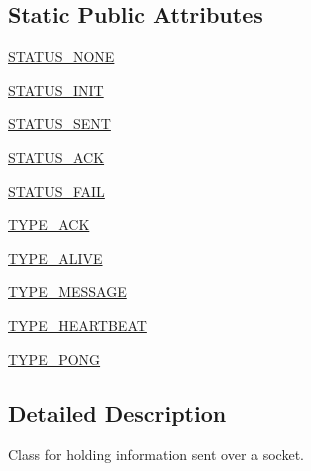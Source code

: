 \subsection*{Static Public Attributes}
\begin{DoxyCompactItemize}
\item 
\hyperlink{classparlai_1_1mturk_1_1core_1_1socket__manager_1_1Packet_a1237bf3d9cb9fef156dace9dd2de8f06}{S\+T\+A\+T\+U\+S\+\_\+\+N\+O\+NE}
\item 
\hyperlink{classparlai_1_1mturk_1_1core_1_1socket__manager_1_1Packet_ac7a439a9aef3339f42558e27171f7061}{S\+T\+A\+T\+U\+S\+\_\+\+I\+N\+IT}
\item 
\hyperlink{classparlai_1_1mturk_1_1core_1_1socket__manager_1_1Packet_abfabd845764bfa00699af28d4deea584}{S\+T\+A\+T\+U\+S\+\_\+\+S\+E\+NT}
\item 
\hyperlink{classparlai_1_1mturk_1_1core_1_1socket__manager_1_1Packet_a6743a9f6372bb8352f3b692621b3298a}{S\+T\+A\+T\+U\+S\+\_\+\+A\+CK}
\item 
\hyperlink{classparlai_1_1mturk_1_1core_1_1socket__manager_1_1Packet_a7cc699f5365aa9fcbc1a10c90aad95e4}{S\+T\+A\+T\+U\+S\+\_\+\+F\+A\+IL}
\item 
\hyperlink{classparlai_1_1mturk_1_1core_1_1socket__manager_1_1Packet_a224c6c3112b56fe59dc3990fe85147c8}{T\+Y\+P\+E\+\_\+\+A\+CK}
\item 
\hyperlink{classparlai_1_1mturk_1_1core_1_1socket__manager_1_1Packet_a27bbf4383c9701a272d78915d7e31496}{T\+Y\+P\+E\+\_\+\+A\+L\+I\+VE}
\item 
\hyperlink{classparlai_1_1mturk_1_1core_1_1socket__manager_1_1Packet_a8580594048b1ff37a81fb09d49fda717}{T\+Y\+P\+E\+\_\+\+M\+E\+S\+S\+A\+GE}
\item 
\hyperlink{classparlai_1_1mturk_1_1core_1_1socket__manager_1_1Packet_abc37bc685e6addbbe2e872af6ddf9fb2}{T\+Y\+P\+E\+\_\+\+H\+E\+A\+R\+T\+B\+E\+AT}
\item 
\hyperlink{classparlai_1_1mturk_1_1core_1_1socket__manager_1_1Packet_ab226c447695e66b324b03b6efa83be3d}{T\+Y\+P\+E\+\_\+\+P\+O\+NG}
\end{DoxyCompactItemize}


\subsection{Detailed Description}
\begin{DoxyVerb}Class for holding information sent over a socket.
\end{DoxyVerb}
 

